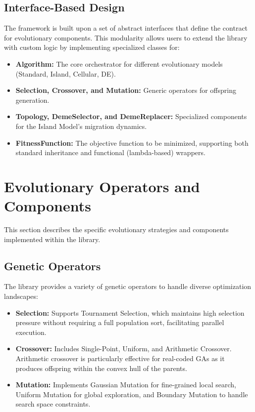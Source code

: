 \documentclass[conference]{IEEEtran}
\begin{document}
    \subsection{Interface-Based Design}
    The framework is built upon a set of abstract interfaces that define the contract for evolutionary components. This modularity allows users to extend the library with custom logic by implementing specialized classes for:
    \begin{itemize}
        \item \textbf{Algorithm:} The core orchestrator for different evolutionary models (Standard, Island, Cellular, DE).
        \item \textbf{Selection, Crossover, and Mutation:} Generic operators for offspring generation.
        \item \textbf{Topology, DemeSelector, and DemeReplacer:} Specialized components for the Island Model's migration dynamics.
        \item \textbf{FitnessFunction:} The objective function to be minimized, supporting both standard inheritance and functional (lambda-based) wrappers.
    \end{itemize}

    \section{Evolutionary Operators and Components}
    This section describes the specific evolutionary strategies and components implemented within the library.

    \subsection{Genetic Operators}
    The library provides a variety of genetic operators to handle diverse optimization landscapes:
    \begin{itemize}
        \item \textbf{Selection:} Supports Tournament Selection, which maintains high selection pressure without requiring a full population sort, facilitating parallel execution.
        \item \textbf{Crossover:} Includes Single-Point, Uniform, and Arithmetic Crossover. Arithmetic crossover is particularly effective for real-coded GAs as it produces offspring within the convex hull of the parents.
        \item \textbf{Mutation:} Implements Gaussian Mutation for fine-grained local search, Uniform Mutation for global exploration, and Boundary Mutation to handle search space constraints.
    \end{itemize}
\end{document}
